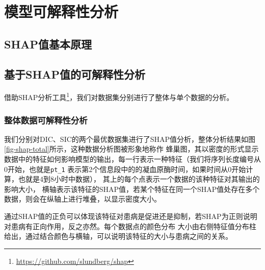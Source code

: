 \documentclass[12pt, a4paper, oneside]{ctexart}
\numberwithin{equation}{section}  %
\begin{document}
\section{模型可解释性分析}
\subsection{SHAP值基本原理}
\subsection{基于SHAP值的可解释性分析}
借助SHAP分析工具\footnote{\url{https://github.com/slundberg/shap}}，我们对数据集分别进行了整体与单个数据的分析。
\subsubsection{整体数据可解释性分析}
我们分别对DIC、SIC的两个最优数据集进行了SHAP值分析，整体分析结果如图\ref{fig-shap-total}所示，这种数据分析图被形象地称作
蜂巢图，其以密度的形式显示数据中的特征如何影响模型的输出，每一行表示一种特征（我们将序列长度编号从0开始，也就是\texttt{pt\_1}
表示第2个信息段中的的凝血原酶时间，如果时间从0开始计算，也就是4到8小时中数据），
其上的每个点表示一个数据的该种特征对其输出的影响大小，
横轴表示该特征的SHAP值，若某个特征在同一个SHAP值处存在多个数据，则会在纵轴上进行堆叠，以显示密度大小。

通过SHAP值的正负可以体现该特征对患病是促进还是抑制，若SHAP为正则说明对患病有正向作用，反之亦然。每个数据点的颜色分布
大小由右侧特征值分布柱给出，通过结合颜色与横轴，可以说明该特征的大小与患病之间的关系。
\end{document}
